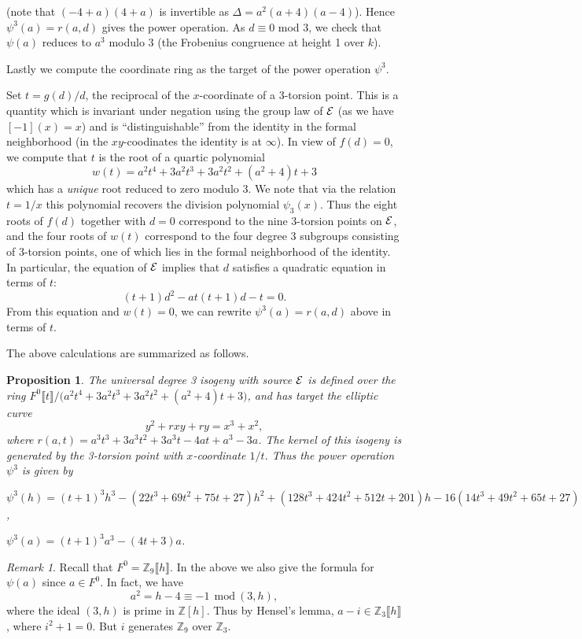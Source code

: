 \documentclass{gtpart}
\newtheorem{prop}[thm]{Proposition}
\theoremstyle{definition}
\theoremstyle{remark}
\newtheorem{rmk}[thm]{Remark}
\newcommand{\mb}[1]{\mathbb{#1}}
\begin{document}
(note that $(-4 + a) (4 + a)$ is invertible as $\Delta = 
a^2(a + 4)(a - 4)$).  Hence $\psi^3(a) = r(a,d)$ gives the power 
operation.  As $d \equiv 0$ mod 3, we check that $\psi(a)$ reduces to $a^3$ modulo 3 (the Frobenius 
congruence at height 1 over $k$).  

Lastly we compute the coordinate ring as the target of the power 
operation $\psi^3$.  

Set $t = g(d)/d$, the reciprocal of the 
$x$-coordinate of a 3-torsion point.  This is a quantity which is 
invariant under negation using the group law of $\cal E$ (as we have 
$[-1](x) = x$) and is ``distinguishable'' from the identity in the formal 
neighborhood (in the $xy$-coodinates the identity is at $\infty$).  In view of 
$f(d) = 0$, we compute that $t$ is the root of a quartic polynomial 
\[
 w(t) = a^2 t^4 + 3 a^2 t^3 + 3 a^2 t^2 + (a^2 + 4) t + 3
\]
which has a {\em unique} root reduced to zero modulo 3.  We note that via the 
relation $t = 1/x$ this polynomial recovers the division polynomial 
$\psi_3(x)$.  Thus the eight roots of $f(d)$ together with $d = 0$ 
correspond to the nine 3-torsion points on $\cal E$, and the four roots 
of $w(t)$ correspond to the four degree 3 subgroups consisting of 
3-torsion points, one of which lies in the formal neighborhood of the 
identity.  In particular, the equation of $\cal E$ implies that $d$ 
satisfies a quadratic equation in terms of $t$: 
\[
 (t + 1) d^2 - a t (t + 1) d - t = 0.
\]
From this equation and $w(t) = 0$, we can rewrite $\psi^3(a) = r(a,d)$ 
above in terms of $t$.  

The above calculations are summarized as follows.  
\begin{prop}
 The universal degree 3 isogeny with source $\cal E$ is defined over the 
 ring $F^0 \llbracket t \rrbracket / \big(a^2 t^4 + 3 a^2 t^3 + 3 a^2 t^2 + 
 (a^2 + 4) t + 3\big)$, and has target the elliptic curve 
 \[
  y^2 + r x y + r y = x^3 + x^2,
 \]
 where $r(a,t) = a^3 t^3 + 3 a^3 t^2 + 3 a^3 t - 4 a t + a^3 - 3 a$.  The 
 kernel of this isogeny is generated by the 3-torsion point with 
 $x$-coordinate $1/t$.  Thus the power operation $\psi^3$ is given by 
 
 $\psi^3(h) = (t + 1)^3 h^3 - (22 t^3 + 69 t^2 + 75 t + 27) h^2 + 
 (128 t^3 + 424 t^2 + 512 t + 201) h - 16 (14 t^3 + 49 t^2 + 65 t + 27)$, 

 $\psi^3(a) = (t + 1)^3 a^3 - (4 t + 3) a$.  
\end{prop}
\begin{rmk}
 Recall that $F^0 = 
{\mb Z}_9 \llbracket h \rrbracket$.  In the above we also give the formula for $\psi(a)$ since $a \in F^0$.  
In fact, we have 
\[
 a^2 = h - 4 \equiv -1~~\text{mod}~(3,h),
\]
where the ideal $(3,h)$ is prime in ${\mb Z} [h]$.  Thus by Hensel's lemma, $a - i \in {\mb Z}_3 \llbracket h \rrbracket$, where $i^2 + 1 = 0$.  But $i$ 
generates ${\mb Z}_9$ over ${\mb Z}_3$.  
\end{rmk}  
\end{document}
